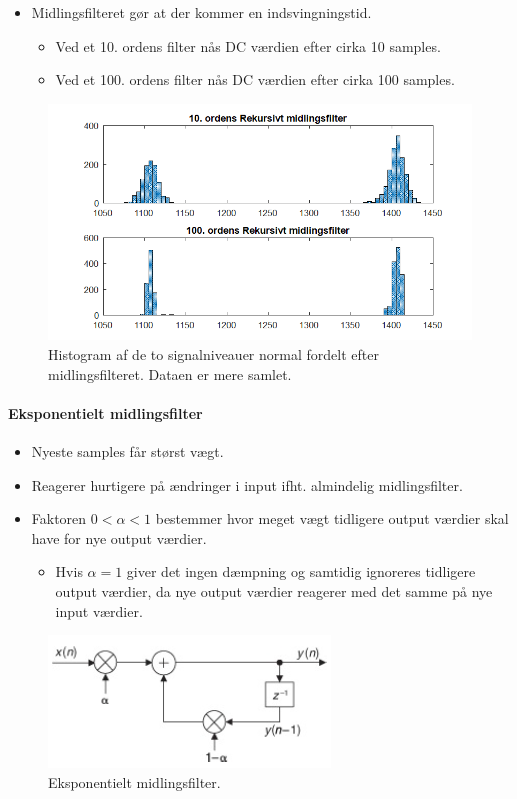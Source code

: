 \documentclass[danish]{article}
\begin{document}
\begin{itemize}
	\item Midlingsfilteret gør at der kommer en indsvingningstid. \begin{itemize}
		\item Ved et 10. ordens filter nås DC værdien efter cirka 10 samples.
		\item Ved et 100. ordens filter nås DC værdien efter cirka 100 samples.
	\end{itemize}
\end{itemize}

\begin{figure}[H]
	\centering
	\includegraphics[width=0.6\linewidth]{graphics/case3_4}
	\caption{Histogram af de to signalniveauer normal fordelt efter midlingsfilteret. Dataen er mere samlet.}
	\label{fig:case3_4}
\end{figure}

\paragraph{Eksponentielt midlingsfilter}
\begin{itemize}
	\item Nyeste samples får størst vægt.
	\item Reagerer hurtigere på ændringer i input ifht. almindelig midlingsfilter.
	\item Faktoren $0<\si{\alpha}<1$ bestemmer hvor meget vægt tidligere output værdier skal have for nye output værdier.
	\begin{itemize}
		\item Hvis $\si{\alpha}=1$ giver det ingen dæmpning og samtidig ignoreres tidligere output værdier, da nye output værdier reagerer med det samme på nye input værdier.
	\end{itemize}
\end{itemize}

\begin{figure} [H]
	\centering
	\includegraphics[width=0.4\linewidth]{graphics/exponentieltfilter}
	\caption{Eksponentielt midlingsfilter.}
	\label{fig:exponentieltfilter}
\end{figure}
\end{document}
